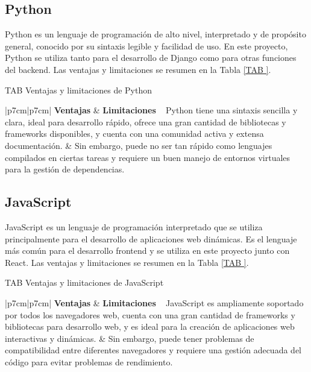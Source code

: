 \subsection{Python}

Python es un lenguaje de programación de alto nivel, interpretado y de propósito general, conocido por su sintaxis legible y facilidad de uso. En este proyecto, Python se utiliza tanto para el desarrollo de Django como para otras funciones del backend. Las ventajas y limitaciones se resumen en la Tabla \ref{TAB
}.

\begin{table}[Python]{TAB
}{Ventajas y limitaciones de Python}
\begin{tabular}{|p{7cm}|p{7cm}|}
\hline
\textbf{Ventajas} & \textbf{Limitaciones} \
\hline
Python tiene una sintaxis sencilla y clara, ideal para desarrollo rápido, ofrece una gran cantidad de bibliotecas y frameworks disponibles, y cuenta con una comunidad activa y extensa documentación. & Sin embargo, puede no ser tan rápido como lenguajes compilados en ciertas tareas y requiere un buen manejo de entornos virtuales para la gestión de dependencias. \
\hline
\end{tabular}
\end{table}

\subsection{JavaScript}

JavaScript es un lenguaje de programación interpretado que se utiliza principalmente para el desarrollo de aplicaciones web dinámicas. Es el lenguaje más común para el desarrollo frontend y se utiliza en este proyecto junto con React. Las ventajas y limitaciones se resumen en la Tabla \ref{TAB
}.

\begin{table}[JavaScript]{TAB
}{Ventajas y limitaciones de JavaScript}
\begin{tabular}{|p{7cm}|p{7cm}|}
\hline
\textbf{Ventajas} & \textbf{Limitaciones} \
\hline
JavaScript es ampliamente soportado por todos los navegadores web, cuenta con una gran cantidad de frameworks y bibliotecas para desarrollo web, y es ideal para la creación de aplicaciones web interactivas y dinámicas. & Sin embargo, puede tener problemas de compatibilidad entre diferentes navegadores y requiere una gestión adecuada del código para evitar problemas de rendimiento. \
\hline
\end{tabular}
\end{table}

